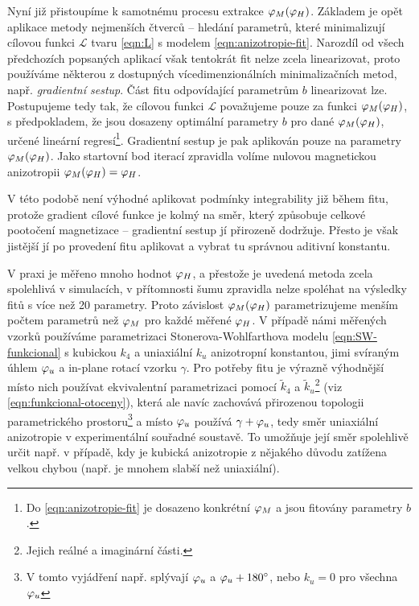 Nyní již přistoupíme k samotnému procesu extrakce $\varphi_M(\varphi_H)$.
Základem je opět aplikace metody nejmenších čtverců -- hledání parametrů, které minimalizují cílovou funkci $\mathcal{L}$ tvaru \eqref{eqn:L} s modelem \eqref{eqn:anizotropie-fit}.
Narozdíl od všech předchozích popsaných aplikací však tentokrát fit nelze zcela linearizovat, proto používáme některou z dostupných vícedimenzionálních minimalizačních metod, např. \emph{gradientní sestup}.
Část fitu odpovídající parametrům $b$ linearizovat lze.
Postupujeme tedy tak, že cílovou funkci $\mathcal{L}$ považujeme pouze za funkci $\varphi_M(\varphi_H)$, s předpokladem, že jsou dosazeny optimální parametry $b$ pro dané $\varphi_M(\varphi_H)$, určené lineární regresí\footnote{Do \eqref{eqn:anizotropie-fit} je dosazeno konkrétní $\varphi_M$ a jsou fitovány parametry $b$.}.
Gradientní sestup je pak aplikován pouze na parametry $\varphi_M(\varphi_H)$.
Jako startovní bod iterací zpravidla volíme nulovou magnetickou anizotropii $\varphi_M(\varphi_H)=\varphi_H$.

V této podobě není výhodné aplikovat podmínky integrability již během fitu, protože gradient cílové funkce je kolmý na směr, který způsobuje celkové pootočení magnetizace -- gradientní sestup jí přirozeně dodržuje.
Přesto je však jistější jí po provedení fitu aplikovat a vybrat tu správnou aditivní konstantu.

V praxi je měřeno mnoho hodnot $\varphi_H$, a přestože je uvedená metoda zcela spolehlivá v simulacích, v přítomnosti šumu zpravidla nelze spoléhat na výsledky fitů s více než 20 parametry.
Proto závislost $\varphi_M(\varphi_H)$ parametrizujeme menším počtem parametrů než $\varphi_M$ pro každé měřené $\varphi_H$.
V případě námi měřených vzorků používáme parametrizaci Stonerova-Wohlfarthova modelu \eqref{eqn:SW-funkcional} s kubickou $k_4$ a uniaxiální $k_u$ anizotropní konstantou, jimi svíraným úhlem $\varphi_u$ a in-plane rotací vzorku $\gamma$.
Pro potřeby fitu je výrazně výhodnější místo nich používat ekvivalentní parametrizaci pomocí $\tilde{k}_4$ a $\tilde{k}_u$\footnote{Jejich reálné a imaginární části.} (viz \eqref{eqn:funkcional-otoceny}), která ale navíc zachovává přirozenou topologii parametrického prostoru\footnote{V tomto vyjádření např. splývají $\varphi_u$ a $\varphi_u+\SI{180}{\degree}$, nebo $k_u=0$ pro všechna $\varphi_u$} a místo $\varphi_u$ používá $\gamma+\varphi_u$, tedy směr uniaxiální anizotropie v experimentální souřadné soustavě.
To umožňuje její směr spolehlivě určit např. v případě, kdy je kubická anizotropie z nějakého důvodu zatížena velkou chybou (např. je mnohem slabší než uniaxiální).

